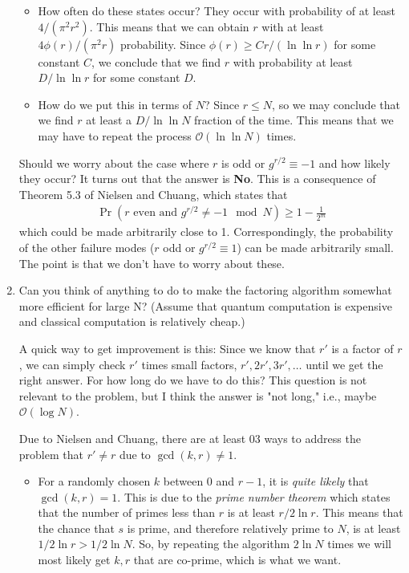 \documentclass{article}
\theoremstyle{definition}
\newcommand{\f}[2]{\frac{#1}{#2}}
\newcommand{\lp}{\left(}
\newcommand{\rp}{\right)}
\begin{document}
\begin{enumerate}[label=(\alph*)]
\begin{itemize}
	\item How often do these states occur?  They occur with probability of at least $4/(\pi^2 r^2)$. This means that we can obtain $r$ with at least $4\phi(r)/(\pi^2 r)$ probability. Since $\phi(r) \geq Cr/(\ln \ln r)$ for some constant $C$, we conclude that we find $r$ with probability at least $D/ \ln \ln r$ for some constant $D$.
	
	\item How do we put this in terms of $N$? Since $ r \leq N$, so we may conclude that we find $r$ at least a $D/\ln \ln N$ fraction of the time. This means that we may have to repeat the process $\boxed{\mathcal{O}(\ln \ln N)}$ times.   
\end{itemize}

Should we worry about the case where $r$ is odd or $g^{r/2} \equiv -1$ and how likely they occur? It turns out that the answer is \textbf{No}. This is a consequence of Theorem 5.3 of Nielsen and Chuang, which states that
\begin{align*}
	\Pr \lp r \text{ even and } g^{r/2} \neq -1 \mod N  \rp \geq 1 - \f{1}{2^m} 
\end{align*}
which could be made arbitrarily close to 1. Correspondingly, the probability of the other failure modes ($r$ odd or $g^{r/2} \equiv 1$) can be made arbitrarily small. The point is that we don't have to worry about these. 

    

\item Can you think of anything to do to make the factoring algorithm somewhat more efficient for large N? (Assume that quantum computation is expensive and classical computation is relatively cheap.)


\noindent A quick way to get improvement is this: Since we know that $r'$ is a factor of $r$, we can simply check $r'$ times small factors, $r', 2r', 3r', \dots$ until we get the right answer. For how long do we have to do this? This question is not relevant to the problem, but I think the answer is "not long," i.e., maybe $\mathcal{O}(\log N)$.


\noindent Due to Nielsen and Chuang, there are at least 03 ways to address the problem that $r'\neq r$ due to $\gcd(k,r)\neq 1$. 
\begin{itemize}
	\item For a randomly chosen $k$ between $0$ and $r-1$, it is \textit{quite likely} that $\gcd(k,r) = 1$. This is due to the \textit{prime number theorem} which states that the number of primes less than $r$ is at least $r/2\ln r$. This means that the chance that $s$ is prime, and therefore relatively prime to $N$, is at least $1/2\ln r > 1/2 \ln N$. So, by repeating the algorithm $\boxed{2\ln N}$ times we will most likely get $k,r$ that are co-prime, which is what we want.
	

\end{itemize}
\end{enumerate}
\end{document}
